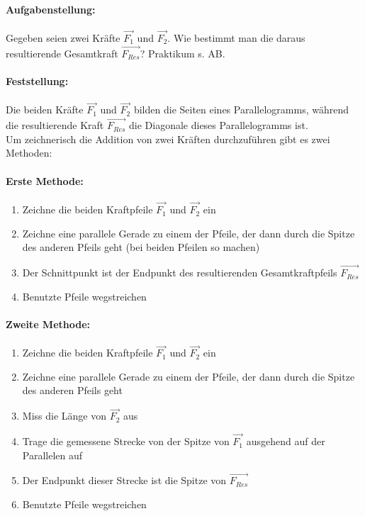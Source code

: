 	\paragraph{Aufgabenstellung:}
	Gegeben seien zwei Kräfte $ \vec{F_1} $ und $ \vec{F_2} $. Wie bestimmt man die daraus resultierende Gesamtkraft $ \vec{F_{Res}} $? Praktikum s. AB.
	\paragraph{Feststellung:}
	Die beiden Kräfte $ \vec{F_1} $ und $ \vec{F_2} $ bilden die Seiten eines Parallelogramms, während die resultierende Kraft $ \vec{F_{Res}} $ die Diagonale dieses Parallelogramms ist.\\
	Um zeichnerisch die Addition von zwei Kräften durchzuführen gibt es zwei Methoden:
	\paragraph{Erste Methode:}
	\begin{enumerate}
		\item Zeichne die beiden Kraftpfeile $ \vec{F_1} $ und $ \vec{F_2} $ ein
		\item Zeichne eine parallele Gerade zu einem der Pfeile, der dann durch die Spitze des anderen Pfeils geht (bei beiden Pfeilen so machen)
		\item Der Schnittpunkt ist der Endpunkt des resultierenden Gesamtkraftpfeils $ \vec{F_{Res}} $
		\item Benutzte Pfeile wegstreichen
	\end{enumerate}
	\paragraph{Zweite Methode:}
	\begin{enumerate}
		\item Zeichne die beiden Kraftpfeile $ \vec{F_1} $ und $ \vec{F_2} $ ein
		\item Zeichne eine parallele Gerade zu einem der Pfeile, der dann durch die Spitze des anderen Pfeils geht
		\item Miss die Länge von $ \vec{F_2} $ aus
		\item Trage die gemessene Strecke von der Spitze von $ \vec{F_1} $ ausgehend auf der Parallelen auf
		\item Der Endpunkt dieser Strecke ist die Spitze von $ \vec{F_{Res}} $
		\item Benutzte Pfeile wegstreichen
	\end{enumerate}
	
